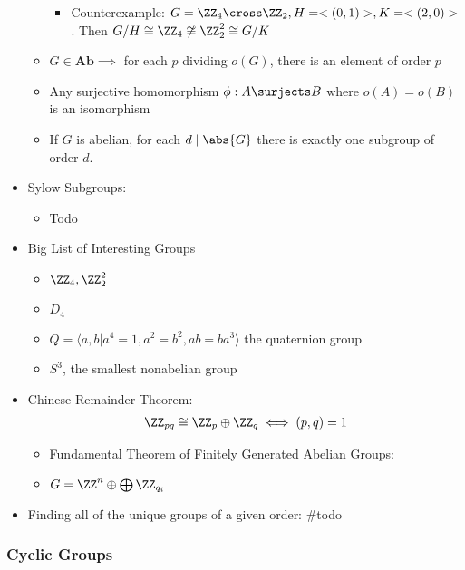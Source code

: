 \begin{itemize}
\begin{itemize}
    \begin{itemize}
    \tightlist
    \item
      Counterexample:
      \(G = \ZZ_4 \cross \ZZ_2, H = <(0,1)>, K = <(2,0)>\). Then
      \(G/H \cong \ZZ_4 \not\cong \ZZ_2^2 \cong G/K\)
    \end{itemize}
  \item
    \(G\in\mathbf{Ab} \implies\) for each \(p\) dividing \(o(G)\), there
    is an element of order \(p\)
  \item
    Any surjective homomorphism \(\phi: A \surjects B\) where
    \(o(A) = o(B)\) is an isomorphism
  \item
    If \(G\) is abelian, for each \(d\mid \abs{G}\) there is exactly one
    subgroup of order \(d\).
  \end{itemize}
\item
  Sylow Subgroups:

  \begin{itemize}
  \tightlist
  \item
    Todo
  \end{itemize}
\item
  Big List of Interesting Groups

  \begin{itemize}
  \tightlist
  \item
    \(\ZZ_4, \ZZ_2^2\)
  \item
    \(D_4\)
  \item
    \(Q = \langle a , b | a ^ { 4 } = 1 , a ^ { 2 } = b ^ { 2 } , a b = b a ^ { 3 } \rangle\)
    the quaternion group
  \item
    \(S^3\), the smallest nonabelian group
  \end{itemize}
\item
  Chinese Remainder Theorem:
  \begin{align*}
  \ZZ_{pq} \cong \ZZ_p \oplus \ZZ_q \iff (p,q) = 1
  \end{align*}

  \begin{itemize}
  \tightlist
  \item
    Fundamental Theorem of Finitely Generated Abelian Groups:
  \item
    \(G = \ZZ^n \oplus \bigoplus \ZZ_{q_i}\)
  \end{itemize}
\item
  Finding all of the unique groups of a given order: \#todo
\end{itemize}

\hypertarget{cyclic-groups}{%
\subsubsection{Cyclic Groups}\label{cyclic-groups}}


